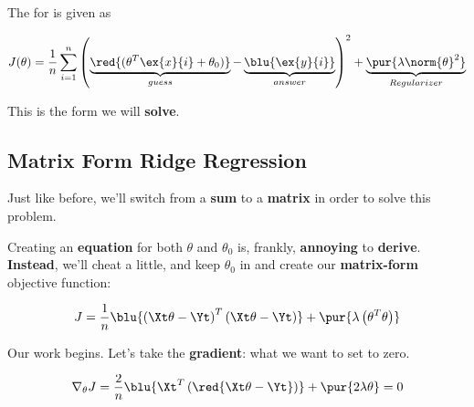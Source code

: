         \begin{kequation}
            The  for  is given as 
            
            \begin{equation*}
                J(\theta) = 
                            \frac{1}{n}  \sum_{i=1}^n 
                            \left( 
                                \underbrace{
                                    \red{(\theta^T \ex{x}{i}  
                                    + \theta_0)}
                                }_{guess}
                                - \underbrace{
                                    \blu{\ex{y}{i}} 
                                }_{answer}
                            \right)^2 
                            + 
                            \underbrace{
                                \pur{ \lambda \norm{\theta}^2 }
                            }_{Regularizer}
            \end{equation*}
        \end{kequation}
        
        This is the form we will \textbf{solve}.
    
    \subsection{Matrix Form Ridge Regression}
        
        Just like before, we'll switch from a \textbf{sum} to a \textbf{matrix} in order to solve this problem.
        
        Creating an \textbf{equation} for both $\theta$ and $\theta_0$ is, frankly, \textbf{annoying} to \textbf{derive}. \textbf{Instead}, we'll cheat a little, and keep $\theta_0$ in and create our \textbf{matrix-form} objective function:
        
        \begin{equation}
            J = \frac{1}{n}
                \blu{
                    \left( \Xt \theta  - \Yt  \right)^T
                    \left( \Xt \theta  - \Yt  \right) 
                }
                + 
                \pur{\lambda 
                    \left( \theta^T \theta    \right)
                }
        \end{equation}
        
        Our work begins. Let's take the \textbf{gradient}: what we want to set to zero.
        
        \begin{equation}
            \nabla_\theta J = 
                \frac{2}{n} 
                \blu{
                    \Xt^T
                    \left( \red{ \Xt \theta  - \Yt } \right) 
                }
                +
                \pur{ 2 \lambda \theta}
            =0
        \end{equation}
        
